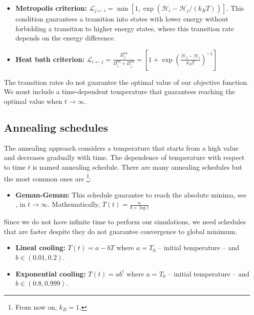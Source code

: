 \begin{itemize}
    \item\textbf{Metropolis criterion:} $\mathcal{L}_{j \leftarrow i} = \min \left[1,\exp\left(\mathcal{H}_{i}-\mathcal{H}_{j}/\left(k_{B}T\right)\right)\right]$. This condition guarantees a transition into states with lower energy without forbidding a transition to higher energy states, where this transition rate depends on the energy difference. 
    \item \textbf{Heat bath criterion:} $\mathcal{L}_{i \leftarrow j} = \frac{\Pi_{j}^{\mathrm{eq}}}{\Pi_{i}^{\mathrm{eq}} + \Pi_{j}^{\mathrm{eq}}} = \left[1 + \exp\left(\frac{\mathcal{H}_{j}- \mathcal{H}_{i}}{k_{B}T}\right)^{-1}\right]$ 
\end{itemize}
 The transition rates do not guarantee the optimal value of our objective function. We must include a time-dependent temperature that guarantees reaching the optimal value when $t \rightarrow \infty$. 
\subsection{Annealing schedules}
The annealing approach considers a temperature that starts from a high value and decreases gradually with time. The dependence of temperature with respect to time $t$ is named annealing schedule. There are many annealing schedules but the most common ones are \footnote{From now on, $k_{B} = 1$.}:
\begin{itemize}
    \item \textbf{Geman-Geman:} This schedule guarantee to reach the absolute minima, see \cite{Geman1984StochasticImages}, in $t \rightarrow \infty$. Mathematically, $T(t) = \frac{a}{b + \log{t}}$
\end{itemize}
Since we do not have infinite time to perform our simulations, we need schedules that are faster despite they do not guarantee convergence to global minimum. 
\begin{itemize}
    \item \textbf{Lineal cooling:} $T(t) = a - bT$ where $a = T_{0}$ -- initial temperature -- and $b \in (0.01,0.2)$.
    \item \textbf{Exponential cooling:} $T(t) = ab^{t}$ where $a = T_{0}$ -- initial temperature -- and $b \in (0.8,0.999)$.
\end{itemize}

